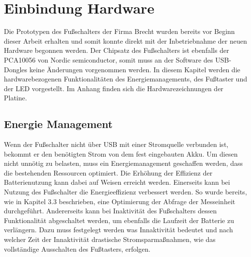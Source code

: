 \section{Einbindung Hardware}
Die Prototypen des Fußschalters der Firma Brecht wurden bereits vor Beginn dieser Arbeit erhalten und somit konnte direkt mit der Inbetriebnahme der neuen Hardware begonnen werden. Der Chipsatz des Fußschalters ist ebenfalls der PCA10056 von Nordic semiconductor, somit muss an der Software des \ac{USB}-Dongles keine Änderungen vorgenommen werden. In diesem Kapitel werden die hardwarebezogenen Funktionalitäten des Energiemanagements, des Fußtaster und der \ac{LED} vorgestellt. Im Anhang finden sich die Hardwarezeichnungen der Platine.

\subsection{Energie Management}
Wenn der Fußschalter nicht über \ac{USB} mit einer Stromquelle verbunden ist, bekommt er den benötigten Strom von dem fest eingebauten Akku. Um diesen nicht unnötig zu belasten, muss ein Energiemanagement geschaffen werden, dass die bestehenden Ressourcen optimiert. Die Erhöhung der Effizienz der Batterienutzung kann dabei auf Weisen erreicht werden. Einerseits kann bei Nutzung des Fußschalter die Energieeffizienz verbessert werden. So wurde bereits, wie in Kapitel 3.3 beschrieben, eine Optimierung der Abfrage der Messeinheit durchgeführt. Andererseits kann bei Inaktivität des Fußschalters dessen Funktionalität abgeschaltet werden, um ebenfalls die Laufzeit der Batterie zu verlängern. Dazu muss festgelegt werden was Innaktivität bedeutet und nach welcher Zeit der Innaktivität drastische Stromsparmaßnahmen, wie das vollständige Ausschalten des Fußtasters, erfolgen.\\

